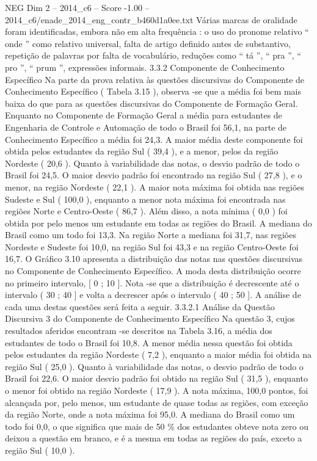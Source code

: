 \begin{textsample}{NEG Dim 2 – 2014\_c6 – Score -1.00 – 2014\_c6/enade\_2014\_eng\_contr\_b460d1a0ee.txt}
Várias marcas de oralidade foram identificadas, embora não em alta frequência : o uso do pronome relativo “ onde ” como relativo universal, falta de artigo definido antes de substantivo, repetição de palavras por falta de vocabulário, reduções como “ tá ”, “ pra ”, “ pro ”, “ prum ”, expressões informais. 3.3.2 Componente de Conhecimento Específico Na parte da prova relativa às questões discursivas do Componente de Conhecimento Específico ( Tabela 3.15 ), observa -se que a média foi bem mais baixa do que para as questões discursivas do Componente de Formação Geral.
Enquanto no Componente de Formação Geral a média para estudantes de Engenharia de Controle e Automação de todo o Brasil foi 56,1, na parte de Conhecimento Específico a média foi 24,3.
A maior média deste componente foi obtida pelos estudantes da região Sul ( 39,4 ), e a menor, pelos da região Nordeste ( 20,6 ).
Quanto à variabilidade das notas, o desvio padrão de todo o Brasil foi 24,5.
O maior desvio padrão foi encontrado na região Sul ( 27,8 ), e o menor, na região Nordeste ( 22,1 ).
A maior nota máxima foi obtida nas regiões Sudeste e Sul ( 100,0 ), enquanto a menor nota máxima foi encontrada nas regiões Norte e Centro-Oeste ( 86,7 ).
Além disso, a nota mínima ( 0,0 ) foi obtida por pelo menos um estudante em todas as regiões do Brasil.
A mediana do Brasil como um todo foi 13,3.
Na região Norte a mediana foi 31,7, nas regiões Nordeste e Sudeste foi 10,0, na região Sul foi 43,3 e na região Centro-Oeste foi 16,7.
O Gráfico 3.10 apresenta a distribuição das notas nas questões discursivas no Componente de Conhecimento Específico.
A moda desta distribuição ocorre no primeiro intervalo, [ 0 ; 10 ].
Nota -se que a distribuição é decrescente até o intervalo ( 30 ; 40 ] e volta a decrescer após o intervalo ( 40 ; 50 ].
A análise de cada uma destas questões será feita a seguir. 3.3.2.1 Análise da Questão Discursiva 3 do Componente de Conhecimento Específico Na questão 3, cujos resultados aferidos encontram -se descritos na Tabela 3.16, a média dos estudantes de todo o Brasil foi 10,8.
A menor média nessa questão foi obtida pelos estudantes da região Nordeste ( 7,2 ), enquanto a maior média foi obtida na região Sul ( 25,0 ).
Quanto à variabilidade das notas, o desvio padrão de todo o Brasil foi 22,6.
O maior desvio padrão foi obtido na região Sul ( 31,5 ), enquanto o menor foi obtido na região Nordeste ( 17,9 ).
A nota máxima, 100,0 pontos, foi alcançada por, pelo menos, um estudante de quase todas as regiões, com exceção da região Norte, onde a nota máxima foi 95,0.
A mediana do Brasil como um todo foi 0,0, o que significa que mais de 50 \% dos estudantes obteve nota zero ou deixou a questão em branco, e é a mesma em todas as regiões do país, exceto a região Sul ( 10,0 ).

\end{textsample}
